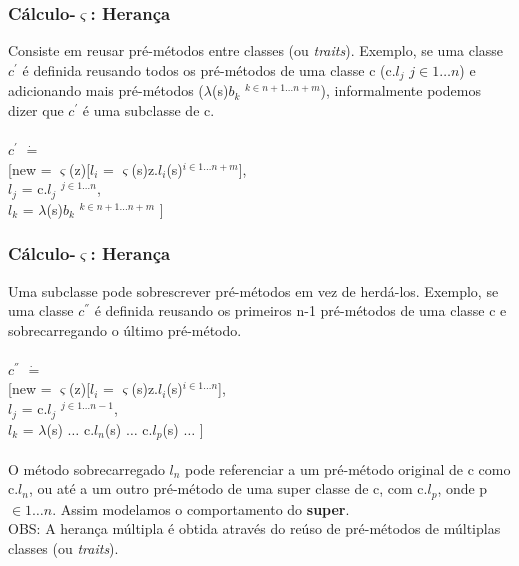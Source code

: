 \documentclass[10pt, compress]{beamer}
\begin{document}
\begin{frame}[fragile]
  \frametitle{Cálculo-$\varsigma$: Herança}
  Consiste em reusar pré-métodos entre classes (ou \textit{traits}). Exemplo, se uma classe $c^{'}$ é definida reusando todos os pré-métodos
  de uma classe c (c.$l_{j}$ $j \in 1 \ldots n$) e adicionando mais pré-métodos ($\lambda$(s)$b_{k}$ $^{k \in n+1 \ldots n+m}$),
  informalmente podemos dizer que $c^{'}$ é uma subclasse de c.
  \\~\\
  $c^{'}$ $\dot{=}$
  \\
  \hspace{0.5cm}[\hspace{0.5cm}new = $\varsigma$(z)[$l_{i}$ = $\varsigma$(s)z.$l_{i}$(s)$^{i \in 1 \ldots n+m}$],
  \\
  \hspace{1cm} $l_{j}$ = c.$l_{j}$ $^{j \in 1 \ldots n}$,
  \\
  \hspace{1cm} $l_{k}$ = $\lambda$(s)$b_{k}$ $^{k \in n+1 \ldots n+m}$ ]
\end{frame}

\begin{frame}[fragile]
  \frametitle{Cálculo-$\varsigma$: Herança}
  Uma subclasse pode sobrescrever pré-métodos em vez de herdá-los. Exemplo, se uma classe $c^{''}$ é definida reusando os primeiros
  n-1 pré-métodos de uma classe c e sobrecarregando o último pré-método.
  \\~\\
  $c^{''}$ $\dot{=}$
  \\
  \hspace{0.5cm}[\hspace{0.5cm}new = $\varsigma$(z)[$l_{i}$ = $\varsigma$(s)z.$l_{i}$(s)$^{i \in 1 \ldots n}$],
  \\
  \hspace{1cm} $l_{j}$ = c.$l_{j}$ $^{j \in 1 \ldots n-1}$,
  \\
  \hspace{1cm} $l_{k}$ = $\lambda$(s) $\ldots$ c.$l_{n}$(s) $\ldots$ c.$l_{p}$(s) $\ldots$ ]
  \\~\\
  O método sobrecarregado $l_{n}$ pode referenciar a um pré-método original de c como c.$l_{n}$, ou até a um outro pré-método de uma
  super classe de c, com c.$l_{p}$, onde p $\in 1 \ldots n$. Assim modelamos o comportamento do {\bf super}.
  \\
  OBS: A herança múltipla é obtida através do reúso de pré-métodos de múltiplas classes (ou \textit{traits}).
\end{frame}
\end{document}
